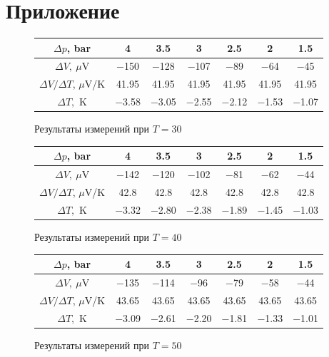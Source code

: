 \documentclass[a4paper,12pt]{report}
\begin{document}
    \section{Приложение}
    \begin{figure}[H]
        \centering
        \begin{tabular}{|c|c|c|c|c|c|c|}
            \hline
            $\Delta p$, bar & 4 & 3.5 & 3 & 2.5 & 2 & 1.5 \\
            \hline
            $\Delta V, \ \mu$V & $-$150 & $-$128 & $-$107 & $-$89 & $-$64 & $-$45 \\
            \hline
            $\Delta V/\Delta T$, $\mu\text{V}$/K & 41.95 & 41.95 & 41.95 & 41.95 & 41.95 & 41.95 \\
            \hline
            $\Delta T,$ K & $-$3.58 & $-$3.05 & $-$2.55 & $-$2.12 & $-$1.53 & $-$1.07 \\
            \hline
        \end{tabular}
        \caption{Результаты измерений при $T=30$ \celsius}
    \end{figure}
    \begin{figure}[H]
        \centering
        \begin{tabular}{|c|c|c|c|c|c|c|}
            \hline
            $\Delta p$, bar & 4 & 3.5 & 3 & 2.5 & 2 & 1.5 \\
            \hline
            $\Delta V, \ \mu$V & $-$142 & $-$120 & $-$102 & $-$81 & $-$62 & $-$44 \\
            \hline
            $\Delta V/\Delta T$, $\mu\text{V}$/K & 42.8 & 42.8 & 42.8 & 42.8 & 42.8 & 42.8 \\
            \hline
            $\Delta T,$ K & $-$3.32 & $-$2.80 & $-$2.38 & $-$1.89 & $-$1.45 & $-$1.03 \\
            \hline
        \end{tabular}
        \caption{Результаты измерений при $T=40$ \celsius}
    \end{figure}
    \begin{figure}[H]
        \centering
        \begin{tabular}{|c|c|c|c|c|c|c|}
            \hline
            $\Delta p$, bar & 4 & 3.5 & 3 & 2.5 & 2 & 1.5 \\
            \hline
            $\Delta V, \ \mu$V & $-$135 & $-$114 & $-$96 & $-$79 & $-$58 & $-$44 \\
            \hline
            $\Delta V/\Delta T$, $\mu\text{V}$/K & 43.65 & 43.65 & 43.65 & 43.65 & 43.65 & 43.65 \\
            \hline
            $\Delta T,$ K & $-$3.09 & $-$2.61 & $-$2.20 & $-$1.81 & $-$1.33 & $-$1.01 \\
            \hline
        \end{tabular}
        \caption{Результаты измерений при $T=50$ \celsius}
    \end{figure}
\end{document}
